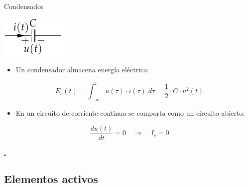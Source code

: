\documentclass[aspectratio=169, xcolor={usenames,svgnames,dvipsnames}]{beamer}
\begin{document}
\begin{frame}{Condensador}
    \begin{center}
    \includegraphics[height=0.2\textheight]{../figs/Condensador.pdf}
    \end{center}
    
    \begin{itemize}
    \item Un condensador almacena \alert{energía eléctrica}:
    \end{itemize}
    \[
      E_c(t) = \int_{-\infty}^t u(\tau) \cdot i(\tau) \; d\tau = \boxed{ \frac{1}{2} \cdot C \cdot u^2(t) }
    \]
    
    \begin{itemize}
    \item En un circuito de corriente continua se comporta como un \alert{circuito abierto}:
    \end{itemize}
    \begin{equation*}
      \frac{du(t)}{dt} = 0 \quad \Rightarrow \quad I_c = 0
    \end{equation*}

    \vspace{-3mm}
    \hyperlink{diapo:bobinas_serie}{.} %
\end{frame}


\subsection{Elementos activos}
\end{document}

